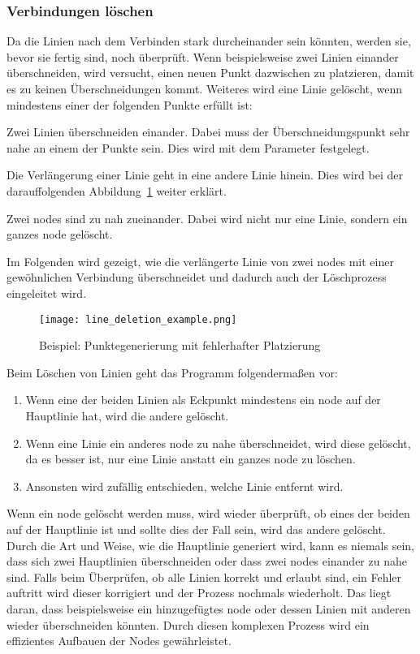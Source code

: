 \subsubsection{Verbindungen löschen}\label{subsubsec:verbindungen-loeschen}
Da die Linien nach dem Verbinden stark durcheinander sein könnten, werden sie, bevor sie fertig sind, noch überprüft.
Wenn beispielsweise zwei Linien einander überschneiden, wird versucht, einen neuen Punkt dazwischen zu platzieren, damit es zu keinen Überschneidungen kommt.
Weiteres wird eine Linie gelöscht, wenn mindestens einer der folgenden Punkte erfüllt ist:
\begin{liste}
    \item Zwei Linien überschneiden einander.
    Dabei muss der Überschneidungspunkt sehr nahe an einem der Punkte sein.
    Dies wird mit dem Parameter  festgelegt.
    \item Die Verlängerung einer Linie geht in eine andere Linie hinein.
    Dies wird bei der darauffolgenden Abbildung~\ref{fig:line-deletion} weiter erklärt.
    \item Zwei nodes sind zu nah zueinander.
    Dabei wird nicht nur eine Linie, sondern ein ganzes node gelöscht.
\end{liste}

Im Folgenden wird gezeigt, wie die verlängerte Linie von zwei nodes mit einer gewöhnlichen Verbindung überschneidet und dadurch auch der Löschprozess eingeleitet wird.
\begin{figure}[H]
    \centering
    \texttt{[image: line\_deletion\_example.png]}
    \caption{Beispiel: Punktegenerierung mit fehlerhafter Platzierung}\label{fig:line-deletion}
\end{figure}

Beim Löschen von Linien geht das Programm folgendermaßen vor:
\begin{enumerate}
    \item Wenn eine der beiden Linien als Eckpunkt mindestens ein node auf der Hauptlinie hat, wird die andere gelöscht.
    \item Wenn eine Linie ein anderes node zu nahe überschneidet, wird diese gelöscht, da es besser ist, nur eine Linie anstatt ein ganzes node zu löschen.
    \item Ansonsten wird zufällig entschieden, welche Linie entfernt wird.
\end{enumerate}

Wenn ein node gelöscht werden muss, wird wieder überprüft, ob eines der beiden auf der Hauptlinie ist und sollte dies der Fall sein, wird das andere gelöscht.
Durch die Art und Weise, wie die Hauptlinie generiert wird, kann es niemals sein, dass sich zwei Hauptlinien überschneiden oder dass zwei nodes einander zu nahe sind.
Falls beim Überprüfen, ob alle Linien korrekt und erlaubt sind, ein Fehler auftritt wird dieser korrigiert und der Prozess nochmals wiederholt.
Das liegt daran, dass beispielsweise ein hinzugefügtes node oder dessen Linien mit anderen wieder überschneiden könnten.
Durch diesen komplexen Prozess wird ein effizientes Aufbauen der Nodes gewährleistet.

